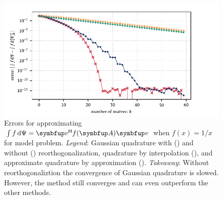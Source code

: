 \begin{figure}[htb]
    \begin{center}
        \includegraphics{imgs/ch3_model_problem.pdf} 
    \end{center}
    \caption[{Errors for approximating \( \int f \,\d\Psi =  \vec{v}^\cT f(\vec{A}) \vec{v} \) when \( f(x) = 1/x \) for model problem.}]{%
    Errors for approximating \( \int f \,\d\Psi =  \vec{v}^\cT f(\vec{A}) \vec{v} \) when \( f(x) = 1/x \) for model problem.
    \hspace{.25em}\emph{Legend}:
    Gaussian quadrature with 
    ({\protect{}})
    and without 
    ({\protect{}})
    reorthogonalization,
    quadrature by interpolation
    ({\protect{}}),
    and approximate quadrature by approximation
    ({\protect{}}).
    \hspace{.25em}\emph{Takeaway}: Without reorthogonaliztion the convergence of Gaussian quadrature is slowed. 
    However, the method still converges and can even outperform the other methods.
    }
    \label{fig:ch3_model_problem}
\end{figure}


